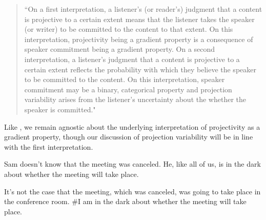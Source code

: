 \documentclass[11pt,fleqn]{article}
\newcommand{\6}{\mbox{$[\hspace*{-.6mm}[$}}
\newcommand{\9}{\mbox{$]\hspace*{-.6mm}]$}}
\begin{document}
{\begin{quote}

``On a first interpretation, a listener's (or reader's) judgment that a content is projective to a certain extent means that the listener takes the speaker (or writer) to be committed to the content to that extent. On this interpretation, projectivity being a gradient property is a consequence of speaker commitment being a gradient property. On a second interpretation, a listener's judgment that a content is projective to a certain extent reflects the probability with which they believe the speaker to be committed to the content. On this interpretation, speaker commitment may be a binary, categorical property and projection variability arises from the listener's uncertainty about the whether the speaker is committed."

\end{quote}

Like \citealt{tbd-variability}, we remain agnostic about the underlying interpretation of projectivity as a gradient property, though our discussion of projection variability will be in line with the first interpretation.}


\begin{exe}

\ex\label{proj-var} 

\begin{xlist}

\ex Sam doesn't know that the meeting was canceled. He, like all of us, is in the dark about whether the meeting will take place.

\ex It's not the case that the meeting, which was canceled, was going to take place in the conference room. \#I am in the dark about whether the meeting will take place.

\end{xlist}
\end{exe}
\end{document}
